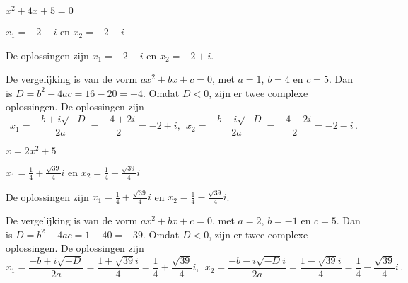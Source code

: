 \documentclass{ximera}
\begin{document}
\begin{exercise}
		\begin{question}
			$ x^2 + 4x + 5 = 0$
			\begin{uitkomst} $x_1 = -2 - i$ en $x_2 = -2 + i$
			\end{uitkomst}
			\begin{oplossing}
				De oplossingen zijn $x_1 = -2 - i$ en $x_2 = -2 + i$.
				
				De vergelijking is van de vorm $ax^2 + bx + c = 0$, met $a=1$, $b=4$ en $c=5$. Dan is $D = b^2 - 4ac = 16 - 20 = -4$. Omdat $D < 0$, zijn er twee complexe oplossingen. De oplossingen zijn
				$$
				x_1 = \frac{-b + i\sqrt{-D}}{2a} = \frac{-4 + 2i}{2} = -2 + i, \ \ x_2 = \frac{-b - i\sqrt{-D}}{2a} = \frac{-4 - 2i}{2} = -2 - i \, .
				$$
			\end{oplossing}
		\end{question}
		
		
		
		
%				
		
		\begin{question}
			$ x = 2x^2 + 5$
			\begin{uitkomst} $x_1 = \frac{1}{4} + \frac{\sqrt{39}}{4} i$ en $x_2 = \frac{1}{4} - \frac{\sqrt{39}}{4} i$
			\end{uitkomst}
			\begin{oplossing}
				De oplossingen zijn $x_1 = \frac{1}{4} + \frac{\sqrt{39}}{4} i$ en $x_2 = \frac{1}{4} - \frac{\sqrt{39}}{4} i$.
				
				De vergelijking is van de vorm $ax^2 + bx + c = 0$, met $a=2$, $b=-1$ en $c=5$. Dan is $D = b^2 - 4ac = 1 - 40 = -39$. Omdat $D < 0$, zijn er twee complexe oplossingen. De oplossingen zijn
				$$
				x_1 = \frac{-b + i\sqrt{-D}}{2a} = \frac{1 + \sqrt{39}i}{4} = \frac{1}{4} + \frac{\sqrt{39}}{4} i, \ \ x_2 = \frac{-b - i\sqrt{-D}i}{2a} = \frac{1 - \sqrt{39}i}{4} = \frac{1}{4} - \frac{\sqrt{39}}{4} i \, .
				$$
			\end{oplossing}
		\end{question}
		
	\end{exercise}
	
\end{document}
